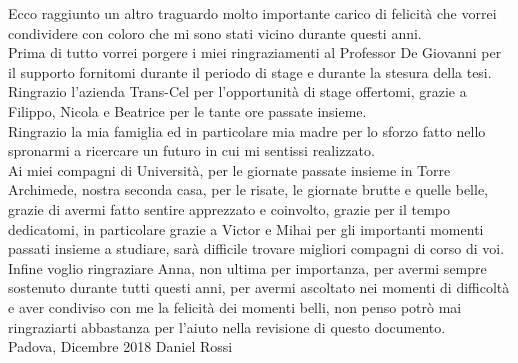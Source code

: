 
Ecco raggiunto un altro traguardo molto importante carico di felicità che vorrei condividere con coloro che mi sono stati vicino durante questi anni.\\
\newline
Prima di tutto vorrei porgere i miei ringraziamenti al Professor De Giovanni per il supporto fornitomi durante il periodo di stage e durante la stesura della tesi.\\
\newline
Ringrazio l'azienda Trans-Cel per l'opportunità di stage offertomi, grazie a Filippo, Nicola e Beatrice per le tante ore passate insieme.\\
\newline
Ringrazio la mia famiglia ed in particolare mia madre per lo sforzo fatto nello spronarmi a ricercare un futuro in cui mi sentissi realizzato.\\
\newline
Ai miei compagni di Università, per le giornate passate insieme in Torre Archimede, nostra seconda casa, per le risate, le giornate brutte e quelle belle, grazie di avermi fatto sentire apprezzato e coinvolto, grazie per il tempo dedicatomi, in particolare grazie a Victor e Mihai per gli importanti momenti passati insieme a studiare, sarà difficile trovare migliori compagni di corso di voi.\\
\newline
Infine voglio ringraziare Anna, non ultima per importanza, per avermi sempre sostenuto durante tutti questi anni, per avermi ascoltato nei momenti di difficoltà e aver condiviso con me la felicità dei momenti belli, non penso potrò mai ringraziarti abbastanza per l'aiuto nella revisione di questo documento.\\
\newline
Padova, Dicembre 2018 \hfill Daniel Rossi
